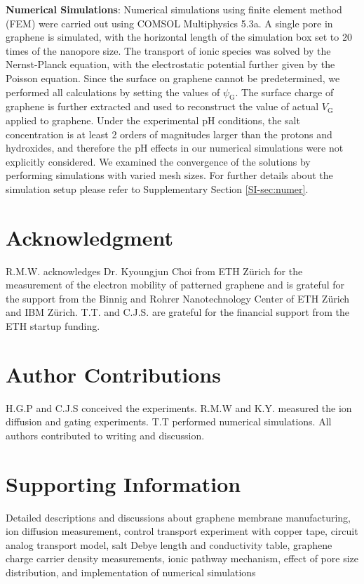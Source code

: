 \vspace{1em}
\noindent
\textbf{Numerical Simulations}: Numerical simulations using finite
element method (FEM) were carried out using COMSOL Multiphysics
5.3a. A single pore in graphene is simulated, with the horizontal
length of the simulation box set to 20 times of the nanopore size. The
transport of ionic species was solved by the Nernst-Planck equation,
with the electrostatic potential further given by the Poisson
equation. Since the surface on graphene cannot be predetermined, we
performed all calculations by setting the values of
$\psi_{\mathrm{G}}$. The surface charge of graphene is further
extracted and used to reconstruct the value of actual $V_{\mathrm{G}}$
applied to graphene. 
{
Under the experimental pH conditions, the salt concentration is at least 2 orders of magnitudes larger than the protons and hydroxides, and therefore the pH effects in our numerical simulations were not explicitly considered.
}
We examined the convergence of the solutions by
performing simulations with varied mesh sizes. For further details
about the simulation setup please refer to Supplementary Section
\ref{SI-sec:numer}.


\section*{Acknowledgment}
\label{sec:acknowledgment}


  R.M.W. acknowledges Dr. Kyoungjun Choi from ETH Z\"{u}rich for the measurement of the electron mobility 
  of patterned graphene and is grateful for the support from the Binnig and Rohrer
  Nanotechnology Center of ETH Z\"{u}rich and IBM Z\"{u}rich. T.T. and
  C.J.S. are grateful for the financial support from the ETH startup
  funding. 


\section{Author Contributions}
\label{sec:author}

H.G.P and C.J.S conceived the experiments. R.M.W and K.Y. measured the ion
diffusion and gating experiments. T.T performed numerical
simulations. All authors contributed to writing and discussion.

\section{Supporting Information}
\label{sec:acknowledgment-1}
Detailed descriptions and discussions about graphene membrane
manufacturing, ion diffusion measurement, control transport
experiment with copper tape, circuit analog transport model, salt
Debye length and conductivity table, graphene charge carrier density
measurements, ionic pathway mechanism, effect of pore size
distribution, and implementation of numerical simulations



